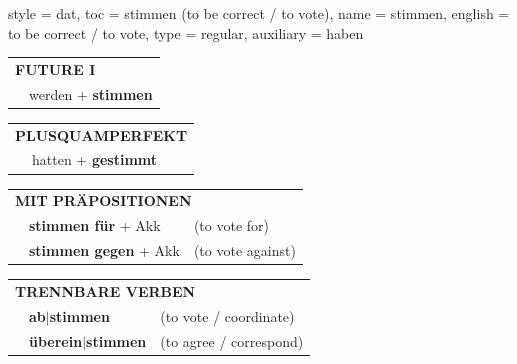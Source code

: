 \begin{verbentry}{
  style = {dat},
  toc = {stimmen (to be correct / to vote)},
  name = {stimmen},
  english = {to be correct / to vote},
  type = {regular},
  auxiliary = {haben}
}
\begin{tabular}{rl}
    \multicolumn{2}{l}{\textbf{FUTURE I} }\\
   & werden + \textbf{stimmen}\\
 
  \end{tabular}
\hfill
   \begin{tabular}{rl}
      \multicolumn{2}{l}{\textbf{PLUSQUAMPERFEKT}}\\
   & hatten + \textbf{gestimmt}\\
  \end{tabular}

   \vspace{10pt}

   \begin{tabular}{lll}
      \multicolumn{3}{l}{\textbf{MIT PRÄPOSITIONEN}}\\
& \textbf{stimmen für} + Akk & (to vote for)\\
& \textbf{stimmen gegen} + Akk & (to vote against)\\
\end{tabular}
  \hfill
   \begin{tabular}{lll}
      \multicolumn{3}{l}{\textbf{TRENNBARE VERBEN}}\\
 & \textbf{ab$|$stimmen} & (to vote / coordinate)\\
 & \textbf{überein$|$stimmen} & (to agree / correspond)\\
  \end{tabular}


  \vspace{-5pt}
\end{verbentry}

